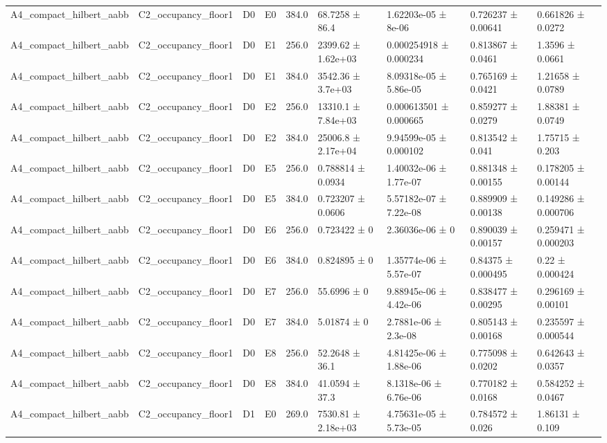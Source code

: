 \begin{table}
\begin{tabular}{lllllllll}
A4\_compact\_hilbert\_aabb & C2\_occupancy\_floor1 & D0 & E0 & 384.0 & 68.7258 ± 86.4 & 1.62203e-05 ± 8e-06 & 0.726237 ± 0.00641 & 0.661826 ± 0.0272 \\
A4\_compact\_hilbert\_aabb & C2\_occupancy\_floor1 & D0 & E1 & 256.0 & 2399.62 ± 1.62e+03 & 0.000254918 ± 0.000234 & 0.813867 ± 0.0461 & 1.3596 ± 0.0661 \\
A4\_compact\_hilbert\_aabb & C2\_occupancy\_floor1 & D0 & E1 & 384.0 & 3542.36 ± 3.7e+03 & 8.09318e-05 ± 5.86e-05 & 0.765169 ± 0.0421 & 1.21658 ± 0.0789 \\
A4\_compact\_hilbert\_aabb & C2\_occupancy\_floor1 & D0 & E2 & 256.0 & 13310.1 ± 7.84e+03 & 0.000613501 ± 0.000665 & 0.859277 ± 0.0279 & 1.88381 ± 0.0749 \\
A4\_compact\_hilbert\_aabb & C2\_occupancy\_floor1 & D0 & E2 & 384.0 & 25006.8 ± 2.17e+04 & 9.94599e-05 ± 0.000102 & 0.813542 ± 0.041 & 1.75715 ± 0.203 \\
A4\_compact\_hilbert\_aabb & C2\_occupancy\_floor1 & D0 & E5 & 256.0 & 0.788814 ± 0.0934 & 1.40032e-06 ± 1.77e-07 & 0.881348 ± 0.00155 & 0.178205 ± 0.00144 \\
A4\_compact\_hilbert\_aabb & C2\_occupancy\_floor1 & D0 & E5 & 384.0 & 0.723207 ± 0.0606 & 5.57182e-07 ± 7.22e-08 & 0.889909 ± 0.00138 & 0.149286 ± 0.000706 \\
A4\_compact\_hilbert\_aabb & C2\_occupancy\_floor1 & D0 & E6 & 256.0 & 0.723422 ± 0 & 2.36036e-06 ± 0 & 0.890039 ± 0.00157 & 0.259471 ± 0.000203 \\
A4\_compact\_hilbert\_aabb & C2\_occupancy\_floor1 & D0 & E6 & 384.0 & 0.824895 ± 0 & 1.35774e-06 ± 5.57e-07 & 0.84375 ± 0.000495 & 0.22 ± 0.000424 \\
A4\_compact\_hilbert\_aabb & C2\_occupancy\_floor1 & D0 & E7 & 256.0 & 55.6996 ± 0 & 9.88945e-06 ± 4.42e-06 & 0.838477 ± 0.00295 & 0.296169 ± 0.00101 \\
A4\_compact\_hilbert\_aabb & C2\_occupancy\_floor1 & D0 & E7 & 384.0 & 5.01874 ± 0 & 2.7881e-06 ± 2.3e-08 & 0.805143 ± 0.00168 & 0.235597 ± 0.000544 \\
A4\_compact\_hilbert\_aabb & C2\_occupancy\_floor1 & D0 & E8 & 256.0 & 52.2648 ± 36.1 & 4.81425e-06 ± 1.88e-06 & 0.775098 ± 0.0202 & 0.642643 ± 0.0357 \\
A4\_compact\_hilbert\_aabb & C2\_occupancy\_floor1 & D0 & E8 & 384.0 & 41.0594 ± 37.3 & 8.1318e-06 ± 6.76e-06 & 0.770182 ± 0.0168 & 0.584252 ± 0.0467 \\
A4\_compact\_hilbert\_aabb & C2\_occupancy\_floor1 & D1 & E0 & 269.0 & 7530.81 ± 2.18e+03 & 4.75631e-05 ± 5.73e-05 & 0.784572 ± 0.026 & 1.86131 ± 0.109 \\

\end{tabular}
\end{table}
